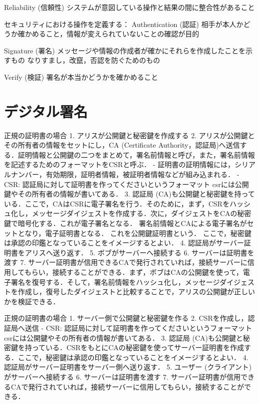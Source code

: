 Reliability (信頼性)
システムが意図している操作と結果の間に整合性があること

セキュリティにおける操作を定義する：
Authentication (認証)
相手が本人かどうか確かめること，情報が変えられていないことの確認が目的

Signature (署名)
メッセージや情報の作成者が確かにそれらを作成したことを示すもの
なりすまし，改竄，否認を防ぐためのもの

Verify (検証)
署名が本当かどうかを確かめること



\section{デジタル署名}
 正規の証明書の場合
1. アリスが公開鍵と秘密鍵を作成する
2. アリスが公開鍵とその所有者の情報をセットにし，CA (Certificate Authority，認証局)へ送信する．証明情報と公開鍵の二つをまとめて，署名前情報と呼び，また，署名前情報を記述するためのフォーマットをCSRと呼ぶ．
- 証明書の証明情報には，シリアルナンバー，有効期限，証明者情報，被証明者情報などが組み込まれる．
- CSR: 認証局に対して証明書を作ってくださいというフォーマット
csrには公開鍵やその所有者の情報が書いてある．
3. 認証局 (CA)も公開鍵と秘密鍵を持っている．ここで，CAはCSRに電子署名を行う．そのために，まず，CSRをハッシュ化し，メッセージダイジェストを作成する．次に，ダイジェストをCAの秘密鍵で暗号化する．これが電子署名となる．
署名前情報とCAによる電子署名がセットとなり，電子証明書となる．
これを公開鍵証明書という．
ここで，秘密鍵は承認の印鑑となっていることをイメージするとよい．
4. 認証局がサーバー証明書をアリスへ送り返す．
5. ボブがサーバーへ接続する
6. サーバーは証明書を渡す
7. サーバー証明書が信用できるCAで発行されていれば，接続サーバーに信用してもらい，接続することができる．まず，ボブはCAの公開鍵を使って，電子署名を復号する．そして，署名前情報をハッシュ化し，メッセージダイジェストを作成し，復号したダイジェストと比較することで，アリスの公開鍵が正しいかを検証できる．

 正規の証明書の場合
1. サーバー側で公開鍵と秘密鍵を作る
2. CSRを作成し，認証局へ送信
- CSR: 認証局に対して証明書を作ってくださいというフォーマット
csrには公開鍵やその所有者の情報が書いてある．
3. 認証局 (CA)も公開鍵と秘密鍵を持っている．CSRをもとにCAの秘密鍵を使ってサーバー証明書を作成する．ここで，秘密鍵は承認の印鑑となっていることをイメージするとよい．
4. 認証局がサーバー証明書をサーバー側へ送り返す．
5. ユーザー (クライアント)がサーバーへ接続する
6. サーバーは証明書を渡す
7. サーバー証明書が信用できるCAで発行されていれば，接続サーバーに信用してもらい，接続することができる．

